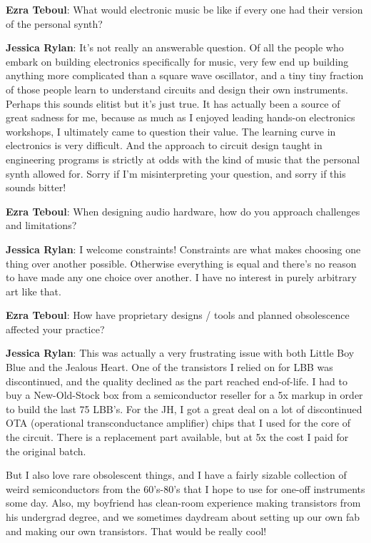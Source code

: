 \textbf{Ezra Teboul}: What would electronic music be like if every one had their version of the personal synth? 
        
\textbf{Jessica Rylan}: It's not really an answerable question. Of all the people who embark on building electronics specifically for music, very few end up building anything more complicated than a square wave oscillator, and a tiny tiny fraction of those people learn to understand circuits and design their own instruments. Perhaps this sounds elitist but it's just true. It has actually been a source of great sadness for me, because as much as I enjoyed leading hands-on electronics workshops, I ultimately came to question their value. The learning curve in electronics is very difficult. And the approach to circuit design taught in engineering programs is strictly at odds with the kind of music that the personal synth allowed for. Sorry if I'm misinterpreting your question, and sorry if this sounds bitter!

\textbf{Ezra Teboul}: When designing audio hardware, how do you approach challenges and limitations?

\textbf{Jessica Rylan}: I welcome constraints! Constraints are what makes choosing one thing over another possible. Otherwise everything is equal and there's no reason to have made any one choice over another. I have no interest in purely arbitrary art like that.

\textbf{Ezra Teboul}: How have proprietary designs / tools and planned obsolescence affected your practice?
					
\textbf{Jessica Rylan}: This was actually a very frustrating issue with both Little Boy Blue and the Jealous Heart. One of the transistors I relied on for LBB was discontinued, and the quality declined as the part reached end-of-life. I had to buy a New-Old-Stock box from a semiconductor reseller for a 5x markup in order to build the last 75 LBB's. For the JH, I got a great deal on a lot of discontinued OTA (operational transconductance amplifier) chips that I used for the core of the circuit. There is a replacement part available, but at 5x the cost I paid for the original batch.

But I also love rare obsolescent things, and I have a fairly sizable collection of weird semiconductors from the 60's-80's that I hope to use for one-off instruments some day. Also, my boyfriend has clean-room experience making transistors from his undergrad degree, and we sometimes daydream about setting up our own fab and making our own transistors. That would be really cool!

